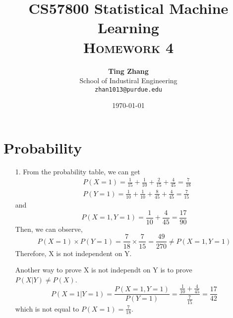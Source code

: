 \documentclass[11pt]{article}
\title{
\textbf{CS57800 Statistical Machine Learning} \\ \textsc{Homework 4} \\
\normalsize\vspace{0.1in}
}
\author{
	\textbf{Ting Zhang} \\
	School of Industiral Engineering\\
	\texttt{zhan1013@purdue.edu}
}
\date{\today}
\begin{document}
\maketitle

\section{Probability}
\begin{itemize}
\item[1.]
From the probability table, we can get 
\begin{align*}
& P(X=1)=\frac{1}{15}+\frac{1}{10}+\frac{2}{15}+\frac{4}{45}=\frac{7}{18} \\
& P(Y=1)=\frac{1}{10}+\frac{1}{10}+\frac{8}{45}+\frac{4}{45}=\frac{7}{15}
\end{align*}
and 
\begin{equation*}
P(X=1,Y=1)=\frac{1}{10}+\frac{4}{45}=\frac{17}{90}
\end{equation*}
Then, we can observe, 
\begin{equation*}
P(X=1) \times P(Y=1) = \frac{7}{18} \times \frac{7}{15} = \frac{49}{270} \neq P(X=1,Y=1)
\end{equation*}
Therefore, X is not independent on Y.

Another way to prove X is not independt on Y is to prove $P(X|Y) \neq P(X)$.
\begin{equation*}
P(X=1|Y=1)=\frac{P(X=1,Y=1)}{P(Y=1)}=\frac{\frac{1}{10}+\frac{4}{45}}{\frac{7}{15}}=\frac{17}{42}
\end{equation*}
which is not equal to $P(X=1)=\frac{7}{18}$.


\end{itemize}
\end{document}
